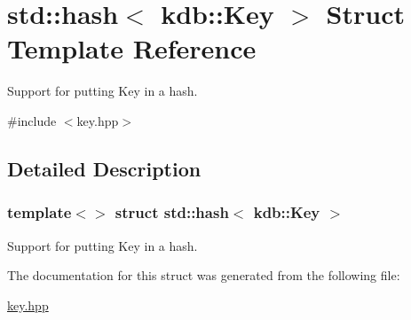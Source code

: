 \hypertarget{structstd_1_1hash_3_01kdb_1_1Key_01_4}{}\section{std\+::hash$<$ kdb\+::Key $>$ Struct Template Reference}
\label{structstd_1_1hash_3_01kdb_1_1Key_01_4}


Support for putting Key in a hash.  




{\ttfamily \#include $<$key.\+hpp$>$}



\subsection{Detailed Description}
\subsubsection*{template$<$$>$\newline
struct std\+::hash$<$ kdb\+::\+Key $>$}

Support for putting Key in a hash. 

The documentation for this struct was generated from the following file\+:\begin{DoxyCompactItemize}
\item 
\mbox{\hyperlink{key_8hpp}{key.\+hpp}}\end{DoxyCompactItemize}
